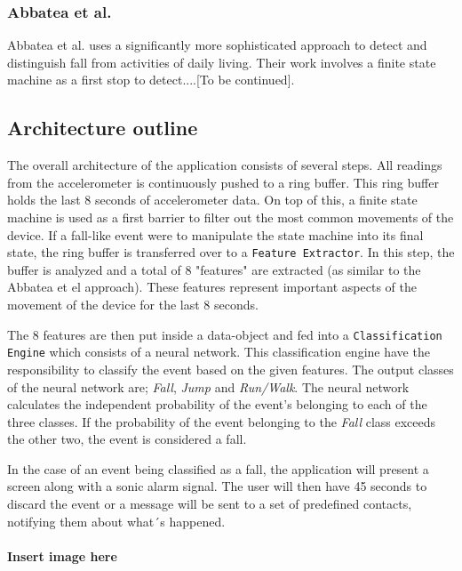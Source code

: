 \documentclass[12pt, a4paper, onecolumn]{article}
\begin{document}
	
	\subsubsection{Abbatea et al.}
		Abbatea et al. uses a significantly more sophisticated approach to detect and distinguish fall from activities of daily living. Their work involves a finite state machine as a first stop to detect....[To be continued].
		
		
		\subsection{Architecture outline}
			The overall architecture of the application consists of several steps. All readings from the accelerometer is continuously pushed to a ring buffer. This ring buffer holds the last 8 seconds of accelerometer data. On top of this, a finite state machine is used as a first barrier to filter out the most common movements of the device. If a fall-like event were to manipulate the state machine into its final state, the ring buffer is transferred over to a \texttt{Feature Extractor}. In this step, the buffer is analyzed and a total of 8 "features" are extracted (as similar to the Abbatea et el approach). These features represent important aspects of the movement of the device for the last 8 seconds. 
			
			The 8 features are then put inside a data-object and fed into a \texttt{Classification Engine} which consists of a neural network. This classification engine have the responsibility to classify the event based on the given features. The output classes of the neural network are; \textit{Fall}, \textit{Jump} and \textit{Run/Walk}. The neural network calculates the independent probability of the event's belonging to each of the three classes. If the probability of the event belonging to the \textit{Fall} class exceeds the other two, the event is considered a fall. 
			
			In the case of an event being classified as a fall, the application will present a screen along with a sonic alarm signal. The user will then have 45 seconds to discard the event or a message will be sent to a set of predefined contacts, notifying them about what´s happened.
			
			\paragraph{Insert image here}
	
	
\end{document}
